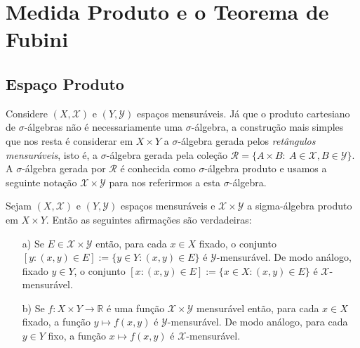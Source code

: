 \chapter[Aula 10]{Medida Produto e o Teorema de Fubini}
\chaptermark{}

\section{Espaço Produto}

Considere $(X, \mathscr{X})$ e $(Y, \mathscr{Y})$ espaços mensuráveis. 
Já que o produto cartesiano de $\sigma$-álgebras não 
é necessariamente uma $\sigma$-álgebra, 
a construção mais simples que nos resta é 
considerar em $X\times Y$ a $\sigma$-álgebra gerada pelos
{\it retângulos mensuráveis}, isto é, a $\sigma$-álgebra gerada
pela coleção 
$\mathscr{R}=\{ A\times B:\ A\in \mathscr{X}, B\in \mathscr{Y}\}.$ 
A $\sigma$-álgebra gerada por $\mathscr{R}$ 
é conhecida como $\sigma$-álgebra produto e 
usamos a seguinte notação $\mathscr{X}\times \mathscr{Y}$
para nos referirmos a esta $\sigma$-álgebra.



\begin{proposicao}\label{Prod. 1}
Sejam $(X, \mathscr{X})$ e $(Y, \mathscr{Y})$ espaços mensuráveis e 
$\mathscr{X}\times \mathscr{Y}$ a sigma-álgebra produto em $X\times Y$.
Então as seguintes afirmações são verdadeiras:
\begin{itemize}
\item[a)] Se $E\in \mathscr{X}\times \mathscr{Y}$ então, para cada $x\in X$ fixado,
o conjunto $[y: (x,y)\in E]:=\{y\in Y: (x,y)\in E\}$ é $\mathscr{Y}$-mensurável. 
De modo análogo, fixado $y\in Y$, 
o conjunto $[x:(x,y)\in E]:=\{x\in X: (x,y)\in E\}$ 
é $\mathscr{X}$-mensurável.



\item[b)] Se $f:X\times Y\to \mathbb{R}$ é uma função $\mathscr{X}\times \mathscr{Y}$ mensurável 
então, para cada $x\in X$ fixado, a função $y\mapsto f(x,y)$ é $\mathscr{Y}$-mensurável. De 
modo análogo, para cada $y\in Y$ fixo, a função $x\mapsto f(x,y)$ é $\mathscr{X}$-mensurável.
\end{itemize}
\end{proposicao}


